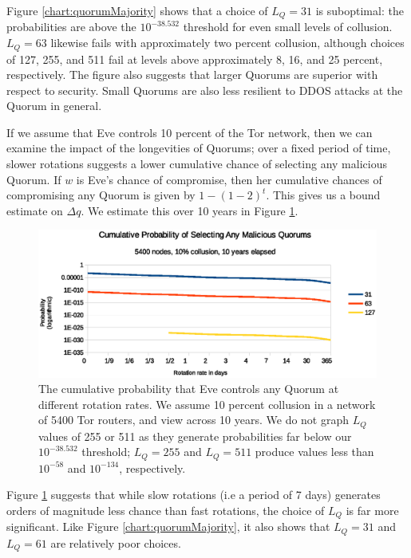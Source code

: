 Figure \ref{chart:quorumMajority} shows that a choice of $ L_{Q} = 31 $ is suboptimal: the probabilities are above the $ 10^{-38.532} $ threshold for even small levels of collusion. $ L_{Q} = 63 $ likewise fails with approximately two percent collusion, although choices of 127, 255, and 511 fail at levels above approximately 8, 16, and 25 percent, respectively. The figure also suggests that larger Quorums are superior with respect to security. Small Quorums are also less resilient to DDOS attacks at the Quorum in general.

If we assume that Eve controls 10 percent of the Tor network, then we can examine the impact of the longevities of Quorums; over a fixed period of time, slower rotations suggests a lower cumulative chance of selecting any malicious Quorum. If $ w $ is Eve's chance of compromise, then her cumulative chances of compromising any Quorum is given by $ 1 - (1-2)^t $. This gives us a bound estimate on $ \Delta q $. We estimate this over 10 years in Figure \ref{chart:cumulativeProbability}.

\begin{figure}[htbp]
	\centering
	\includegraphics[width=1\textwidth]{analysis/CumulativeMaliciousQuorum.eps}
	\caption{The cumulative probability that Eve controls any Quorum at different rotation rates. We assume 10 percent collusion in a network of 5400 Tor routers, and view across 10 years. We do not graph $ L_{Q} $ values of 255 or 511 as they generate probabilities far below our $ 10^{-38.532} $ threshold; $ L_{Q} = 255 $ and $ L_{Q} = 511 $ produce values less than $ 10^{-58} $ and $ 10^{-134} $, respectively.}
	\label{chart:cumulativeProbability}
\end{figure}

Figure \ref{chart:cumulativeProbability} suggests that while slow rotations (i.e a period of 7 days) generates orders of magnitude less chance than fast rotations, the choice of $ L_{Q} $ is far more significant. Like Figure \ref{chart:quorumMajority}, it also shows that $ L_{Q} = 31 $ and $ L_{Q} = 61 $ are relatively poor choices.

